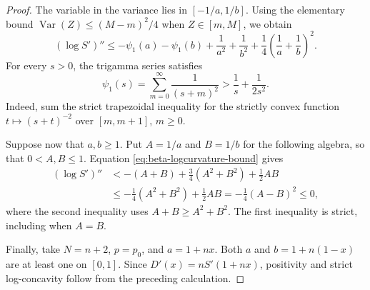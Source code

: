 \documentclass[11pt]{article}
\begin{document}
\begin{proof}
The variable in the variance lies in $[-1/a,1/b]$. Using the elementary
bound $\operatorname{Var}(Z)\le(M-m)^2/4$ when $Z\in[m,M]$, we obtain
\begin{equation}\label{eq:beta-logcurvature-bound}
(\log S')''
\le-\psi_1(a)-\psi_1(b)+\frac1{a^2}+\frac1{b^2}
+\frac14\left(\frac1a+\frac1b\right)^2.
\end{equation}
For every $s>0$, the trigamma series satisfies
\begin{equation*}
\psi_1(s)=\sum_{m=0}^{\infty}\frac1{(s+m)^2}
>\frac1s+\frac1{2s^2}.
\end{equation*}
Indeed, sum the strict trapezoidal inequality for the strictly convex
function $t\mapsto(s+t)^{-2}$ over $[m,m+1]$, $m\ge0$.

Suppose now that $a,b\ge1$. Put $A=1/a$ and $B=1/b$ for the following
algebra, so that $0<A,B\le1$. Equation
\eqref{eq:beta-logcurvature-bound} gives
\begin{align*}
(\log S')''
&<-(A+B)+\frac34(A^2+B^2)+\frac12AB\\
&\le-\frac14(A^2+B^2)+\frac12AB
=-\frac14(A-B)^2\le0,
\end{align*}
where the second inequality uses $A+B\ge A^2+B^2$.
The first inequality is strict, including when $A=B$.

Finally, take $N=n+2$, $p=p_0$, and $a=1+nx$. Both $a$ and
$b=1+n(1-x)$ are at least one on $[0,1]$. Since
$D'(x)=nS'(1+nx)$, positivity and strict log-concavity follow from
the preceding calculation.
\end{proof}
\end{document}
